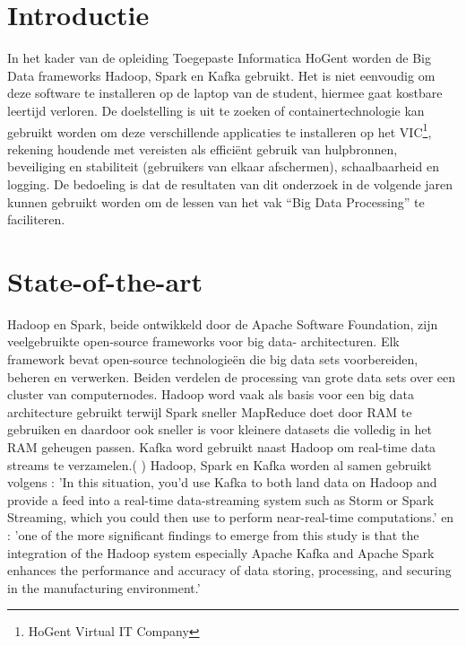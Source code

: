 
\section{Introductie}%
\label{sec:introductie}

In het kader van de opleiding Toegepaste Informatica HoGent worden de Big Data frameworks Hadoop, Spark en Kafka gebruikt. Het is niet eenvoudig om deze software te installeren op de laptop van de student, hiermee gaat kostbare leertijd verloren.
De doelstelling is uit te zoeken of containertechnologie kan gebruikt worden om deze verschillende applicaties te installeren op het VIC\footnote{HoGent Virtual IT Company}, rekening houdende met vereisten als efficiënt gebruik van hulpbronnen, beveiliging en stabiliteit (gebruikers van elkaar afschermen), schaalbaarheid en logging.
De bedoeling is dat de resultaten van dit onderzoek in de volgende jaren kunnen gebruikt worden om de lessen van het vak ``Big Data Processing'' te faciliteren.


\section{State-of-the-art}%
\label{sec:state-of-the-art}
Hadoop en Spark, beide ontwikkeld door de Apache Software Foundation, zijn veelgebruikte open-source frameworks voor big data- architecturen. Elk framework bevat open-source technologieën die big data sets voorbereiden, beheren en verwerken.
Beiden verdelen de processing van grote data sets over een cluster van computernodes.
Hadoop word vaak als basis voor een big data architecture gebruikt terwijl Spark sneller MapReduce doet door RAM te gebruiken en daardoor ook sneller is voor kleinere datasets die volledig in het RAM geheugen passen. Kafka word gebruikt naast Hadoop om real-time data streams te verzamelen.(\autocite{Hadoop} \autocite{Spark} \autocite{Kafka})
Hadoop, Spark en Kafka worden al samen gebruikt volgens \autocite{Holmes2012}:
'In this situation, you'd use Kafka to both land data on Hadoop and provide a feed into a real-time data-streaming system such as Storm or Spark Streaming, which you could then use to perform near-real-time computations.' en \autocite{Leang2019}:
'one of the more significant findings to emerge from this study is that the integration of the Hadoop system especially Apache Kafka and Apache Spark enhances the performance and accuracy of data storing, processing, and securing in the manufacturing environment.'

